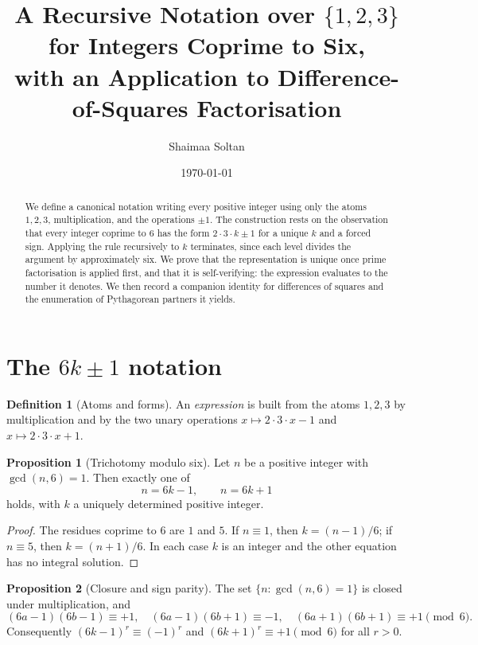 \documentclass[11pt]{article}
\title{A Recursive Notation over $\{1,2,3\}$ for Integers Coprime to Six,\\
       with an Application to Difference-of-Squares Factorisation}
\author{Shaimaa Soltan}
\date{\today}
\theoremstyle{definition}
\newtheorem{definition}{Definition}
\newtheorem{proposition}{Proposition}
\begin{document}
\maketitle

\begin{abstract}
We define a canonical notation writing every positive integer using only the
atoms $1,2,3$, multiplication, and the operations $\pm 1$. The construction
rests on the observation that every integer coprime to $6$ has the form
$2\cdot 3\cdot k \pm 1$ for a unique $k$ and a forced sign. Applying the rule
recursively to $k$ terminates, since each level divides the argument by
approximately six. We prove that the representation is unique once prime
factorisation is applied first, and that it is self-verifying: the expression
evaluates to the number it denotes. We then record a companion identity for
differences of squares and the enumeration of Pythagorean partners it yields.
\end{abstract}

\section{The $6k\pm1$ notation}

\begin{definition}[Atoms and forms]
An \emph{expression} is built from the atoms $1,2,3$ by multiplication and by
the two unary operations $x \mapsto 2\cdot 3\cdot x - 1$ and
$x \mapsto 2\cdot 3\cdot x + 1$.
\end{definition}

\begin{proposition}[Trichotomy modulo six]
Let $n$ be a positive integer with $\gcd(n,6)=1$. Then exactly one of
\[
  n = 6k-1, \qquad n = 6k+1
\]
holds, with $k$ a uniquely determined positive integer.
\end{proposition}

\begin{proof}
The residues coprime to $6$ are $1$ and $5$. If $n \equiv 1$, then
$k=(n-1)/6$; if $n \equiv 5$, then $k=(n+1)/6$. In each case $k$ is an integer
and the other equation has no integral solution.
\end{proof}

\begin{proposition}[Closure and sign parity]
The set $\{n : \gcd(n,6)=1\}$ is closed under multiplication, and
\[
  (6a-1)(6b-1) \equiv +1, \quad
  (6a-1)(6b+1) \equiv -1, \quad
  (6a+1)(6b+1) \equiv +1 \pmod 6 .
\]
Consequently $(6k-1)^r \equiv (-1)^r$ and $(6k+1)^r \equiv +1 \pmod 6$ for all
$r>0$.
\end{proposition}
\end{document}
